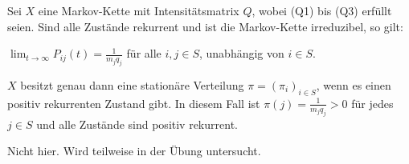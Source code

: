 \documentclass[a4paper,twoside,DIV15,BCOR12mm]{scrbook}
\begin{document}
\begin{satz}
Sei $X$ eine Markov-Kette mit Intensitätsmatrix $Q$, wobei (Q1) bis (Q3) erfüllt seien. Sind alle Zustände rekurrent und ist die Markov-Kette irreduzibel, so gilt:\label{satz:8.7}
\begin{enuma}
\item $\lim_{t\to\infty} P_{ij}(t) = \frac1{m_j q_j}$ für alle $i,j\in S$, unabhängig von $i\in S$.
\item $X$ besitzt genau dann eine stationäre Verteilung $\pi=(\pi_i)_{i\in S}$, wenn es einen positiv rekurrenten Zustand gibt. In diesem Fall ist $\pi(j) = \frac1{m_j q_j}>0$ für jedes $j\in S$ und alle Zustände sind positiv rekurrent.
\end{enuma}
\end{satz}

\begin{beweis}
Nicht hier. Wird teilweise in der Übung untersucht.
\end{beweis}
\end{document}
